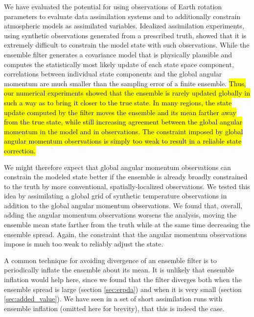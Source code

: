 
We have evaluated the potential for using observations of Earth rotation parameters to evaluate data assimilation systems and to additionally constrain atmospheric models as assimilated variables.  
Idealized assimilation experiments, using synthetic observations generated from a prescribed truth, showed that it is extremely difficult to constrain the model state with such observations.  
While the ensemble filter generates a covariance model that is physically plausible and computes the statistically most likely update of each state space component, correlations between individual state components and the global angular momentum are much smaller than the sampling error of a finite ensemble. 
\hl{Thus, our numerical experiments showed that the ensemble is rarely updated globally in such a way as to bring it closer to the true state. 
In many regions, the state update computed by the filter moves the ensemble and its mean farther away from the true state, while still increasing agreement between the global angular momentum in the model and in observations. 
The constraint imposed by global angular momentum observations is simply too weak to result in a reliable state correction.} 

We might therefore expect that global angular momentum observations can constrain the modeled state better if the ensemble is already broadly constrained to the truth by more conventional, spatially-localized observations. 
We tested this idea by assimilating a global grid of synthetic temperature observations in addition to the global angular momentum observations. 
We found that, overall, adding the angular momentum observations worsens the analysis, moving the ensemble mean state farther from the truth while at the same time decreasing the ensemble spread.
Again, the constraint that the angular momentum observations impose is much too weak to reliably adjust the state.

A common technique for avoiding divergence of an ensemble filter is to periodically inflate the ensemble about its mean. 
It is unlikely that ensemble inflation would help here, since we found that the filter diverges both when the ensemble spread is large (section \ref{sec:erpda}) and when it is very small (section \ref{sec:added_value}). 
We have seen in a set of short assimilation runs with ensemble inflation (omitted here for brevity), that this is indeed the case. 



